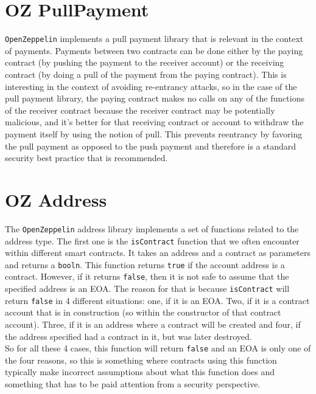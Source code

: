 \section{OZ PullPayment}
\verb|OpenZeppelin| implements a pull payment library that is relevant in the context of payments. Payments between two contracts can be done either by the paying contract (by pushing the payment to the receiver account) or the receiving contract (by doing a pull of the payment from the paying contract). This is interesting in the context of avoiding re-entrancy attacks, so in the case of the pull payment library, the paying contract makes no calls on any of the functions of the receiver contract because the receiver contract may be potentially malicious, and it's better for that receiving contract or account to withdraw the payment itself by using the notion of pull. This prevents reentrancy by favoring the pull payment as opposed to the push payment and therefore is a standard security best practice that is recommended.

\section{OZ Address}
The \verb|OpenZeppelin| address library implements a set of functions related to the address type. The first one is the \verb|isContract| function that we often encounter within different smart contracts. It takes an address and a contract as parameters and returns a \verb|booln|. This function returns \verb|true| if the account address is a contract. However, if it returns \verb|false|, then it is not safe to assume that the specified address is an EOA. The reason for that is because \verb|isContract| will return \verb|false| in 4 different situations: one, if it is an EOA. Two, if it is a contract account that is in construction (so within the constructor of that contract account). Three, if it is an address where a contract will be created and four, if the address specified had a contract in it, but was later destroyed.\\

So for all these 4 cases, this function will return \verb|false| and an EOA is only one of the four reasons, so this is something where contracts using this function typically make incorrect assumptions about what this function does and something that has to be paid attention from a security perspective.\

